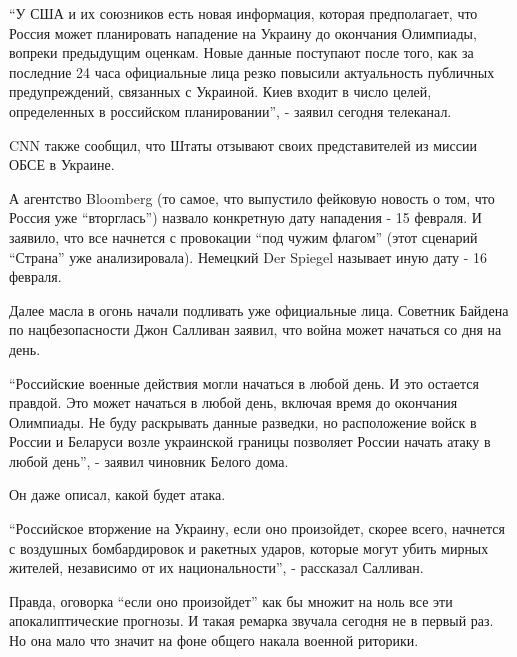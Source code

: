 \enquote{У США и их союзников есть новая информация, которая предполагает, что Россия
может планировать нападение на Украину до окончания Олимпиады, вопреки
предыдущим оценкам. Новые данные поступают после того, как за последние 24 часа
официальные лица резко повысили актуальность публичных предупреждений,
связанных с Украиной. Киев входит в число целей, определенных в российском
планировании}, - заявил сегодня телеканал.

CNN также сообщил, что Штаты отзывают своих представителей из миссии ОБСЕ в
Украине.

А агентство Bloomberg (то самое, что выпустило фейковую новость о том, что
Россия уже \enquote{вторглась}) назвало конкретную дату нападения - 15 февраля. И
заявило, что все начнется с провокации \enquote{под чужим флагом} (этот сценарий
\enquote{Страна} уже анализировала). Немецкий Der Spiegel называет иную дату - 16
февраля.

Далее масла в огонь начали подливать уже официальные лица. Советник Байдена по
нацбезопасности Джон Салливан заявил, что война может начаться со дня на день.

\enquote{Российские военные действия могли начаться в любой день. И это остается
правдой. Это может начаться в любой день, включая время до окончания Олимпиады.
Не буду раскрывать данные разведки, но расположение войск в России и Беларуси
возле украинской границы позволяет России начать атаку в любой день}, - заявил
чиновник Белого дома.

Он даже описал, какой будет атака. 

\enquote{Российское вторжение на Украину, если оно произойдет, скорее всего, начнется с
воздушных бомбардировок и ракетных ударов, которые могут убить мирных жителей,
независимо от их национальности}, - рассказал Салливан.

Правда, оговорка \enquote{если оно произойдет} как бы множит на ноль все эти
апокалиптические прогнозы. И такая ремарка звучала сегодня не в первый раз. Но
она мало что значит на фоне общего накала военной риторики. 


